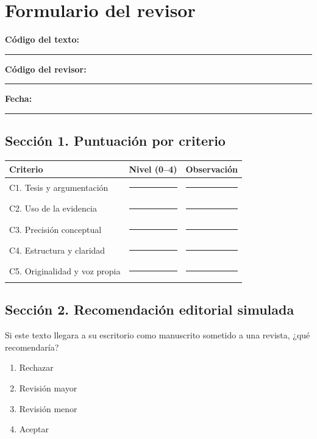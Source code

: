 \documentclass[12pt,a4paper,openany]{report}
\begin{document}
    \chapter{Formulario del revisor}
    \label{anx:revisor}
    
    \textbf{C\'odigo del texto:} \rule{3.5cm}{0.4pt} \quad \textbf{C\'odigo del revisor:} \rule{3cm}{0.4pt} \quad \textbf{Fecha:} \rule{2.5cm}{0.4pt}
    
    \section*{Secci\'on 1. Puntuaci\'on por criterio}
    
    \begin{table}[htbp]
        \centering
        \small
        \begin{tabular}{L{7.2cm} C{3.0cm} L{3.4cm}}
            \toprule
            \textbf{Criterio} & \textbf{Nivel (0--4)} & \textbf{Observaci\'on} \\
            \midrule
            C1. Tesis y argumentaci\'on & \rule{2.2cm}{0.4pt} & \rule{3.0cm}{0.4pt} \\
            C2. Uso de la evidencia & \rule{2.2cm}{0.4pt} & \rule{3.0cm}{0.4pt} \\
            C3. Precisi\'on conceptual & \rule{2.2cm}{0.4pt} & \rule{3.0cm}{0.4pt} \\
            C4. Estructura y claridad & \rule{2.2cm}{0.4pt} & \rule{3.0cm}{0.4pt} \\
            C5. Originalidad y voz propia & \rule{2.2cm}{0.4pt} & \rule{3.0cm}{0.4pt} \\
            \bottomrule
        \end{tabular}
    \end{table}
    
    \section*{Secci\'on 2. Recomendaci\'on editorial simulada}
    
    Si este texto llegara a su escritorio como manuscrito sometido a una revista, ¿qu\'e recomendar\'ia?
    
    \begin{enumerate}[label=\fbox{\phantom{x}}\ \arabic*.,leftmargin=1.6cm]
        \item Rechazar
        \item Revisi\'on mayor
        \item Revisi\'on menor
        \item Aceptar
    \end{enumerate}
    
\end{document}
